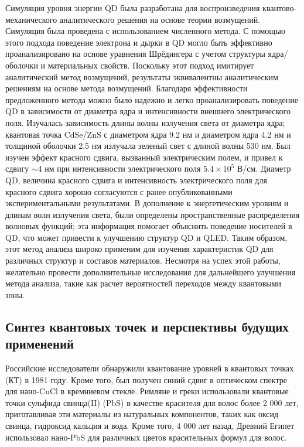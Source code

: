 \documentclass[a4paper,14pt]{extarticle}
\begin{document}
Симуляция уровня энергии QD была разработана для воспроизведения квантово-механического аналитического решения на основе теории возмущений. Симуляция была проведена с использованием численного метода. С помощью этого подхода поведение электрона и дырки в QD могло быть эффективно проанализировано на основе уравнения Шрёдингера с учетом структуры ядра/оболочки и материальных свойств. Поскольку этот подход имитирует аналитический метод возмущений, результаты эквивалентны аналитическим решениям на основе метода возмущений. Благодаря эффективности предложенного метода можно было надежно и легко проанализировать поведение QD в зависимости от диаметра ядра и интенсивности внешнего электрического поля. Изучалась зависимость длины волны излучения света от диаметра ядра; квантовая точка CdSe/ZnS с диаметром ядра 9.2 нм и диаметром ядра 4.2 нм и толщиной оболочки 2.5 нм излучала зеленый свет с длиной волны 530 нм. Был изучен эффект красного сдвига, вызванный электрическим полем, и привел к сдвигу $\sim$4 нм при интенсивности электрического поля $5.4 \times 10^5$ В/см. Диаметр QD, величина красного сдвига и интенсивность электрического поля для красного сдвига хорошо согласуются с ранее опубликованными экспериментальными результатами. В дополнение к энергетическим уровням и длинам волн излучения света, были определены пространственные распределения волновых функций; эта информация помогает объяснить поведение носителей в QD, что может привести к улучшению структур QD и QLED. Таким образом, этот метод анализа широко применим для изучения характеристик QD для различных структур и составов материалов. Несмотря на успех этой работы, желательно провести дополнительные исследования для дальнейшего улучшения метода анализа, такие как расчет вероятностей переходов между квантовыми зоны. 

\subsection{Синтез квантовых точек и перспективы будущих применений}

Российские исследователи обнаружили квантование уровней в квантовых точках (КТ) в 1981 году. Кроме того, был получен синий сдвиг в оптическом спектре для нано-CuCl в кремниевом стекле. Римляне и греки использовали квантовые точки сульфида свинца(II) (PbS) в качестве красителя для волос более 2 000 лет, приготавливая эти материалы из натуральных компонентов, таких как оксид свинца, гидроксид кальция и вода. Кроме того, 4 000 лет назад, Древний Египет использовал нано-PbS для различных цветов красительных формул для волос.
\end{document}
